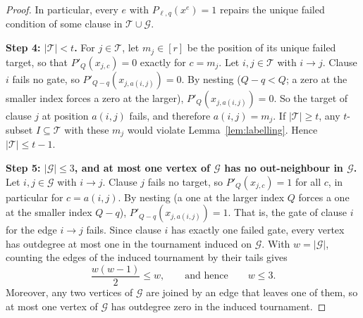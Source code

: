 \documentclass[11pt]{article}
\theoremstyle{definition}
\theoremstyle{remark}
\begin{document}
\begin{proof}
In particular, every \(e\) with \(P_{\ell,q}(x^e)=1\) repairs the unique failed
condition of some clause in \(\mathcal T\cup\mathcal G\).

\medskip\noindent\textbf{Step 4: \(|\mathcal T|<t\).}
For \(j\in\mathcal T\), let \(m_j\in[r]\) be the position of its unique failed
target, so that \(P'_Q(x_{j,c})=0\) exactly for \(c=m_j\). Let
\(i,j\in\mathcal T\) with \(i\to j\). Clause \(i\) fails no gate, so
\(P'_{Q-q}(x_{j,a(i,j)})=0\). By nesting (\(Q-q<Q\); a zero at the smaller
index forces a zero at the larger), \(P'_Q(x_{j,a(i,j)})=0\). So the target of
clause \(j\) at position \(a(i,j)\) fails, and therefore \(a(i,j)=m_j\).
If \(|\mathcal T|\ge t\), any \(t\)-subset \(I\subseteq\mathcal T\) with these
\(m_j\) would violate Lemma~\ref{lem:labelling}. Hence
\(|\mathcal T|\le t-1\).

\medskip\noindent\textbf{Step 5: \(|\mathcal G|\le3\), and at most one vertex of
\(\mathcal G\) has no out-neighbour in \(\mathcal G\).}
Let \(i,j\in\mathcal G\) with \(i\to j\). Clause \(j\) fails no target, so
\(P'_Q(x_{j,c})=1\) for all \(c\), in particular for \(c=a(i,j)\). By nesting
(a one at the larger index \(Q\) forces a one at the smaller index \(Q-q\)),
\(P'_{Q-q}(x_{j,a(i,j)})=1\). That is, the gate of clause \(i\) for the edge
\(i\to j\) fails. Since clause \(i\) has exactly one failed gate, every vertex
has outdegree at most one in the tournament induced on \(\mathcal G\).
With \(w=|\mathcal G|\), counting the edges of the induced tournament by their tails
gives
\[
 \frac{w(w-1)}2\leq w,
 \qquad\text{and hence}\qquad w\leq3.
\]
Moreover, any two vertices of \(\mathcal G\) are joined by an edge that leaves
one of them, so at most one vertex of \(\mathcal G\) has outdegree zero in the
induced tournament.


\end{proof}
\end{document}
